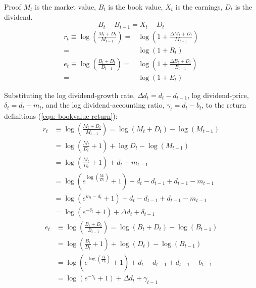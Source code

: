 \documentclass{beamer}
\begin{document}
\begin{frame}[allowframebreaks]{Proof}
		$ M_t $ is the market value, $B_t$ is the book value, $X_t$ is the earnings, $ D_{t} $ is the dividend.
		\begin{equation}
			B_{t}-B_{t-1}=X_{t}-D_{t}
		\end{equation}
	\begin{equation}\label{equ: bookvalue return}
		\begin{aligned}
			r_{t} \equiv \log \left(\frac{M_{t}+D_{t}}{M_{t-1}}\right)=&\log \left(1+\frac{\Delta M_{t}+D_{t}}{M_{t-1}}\right) \\
			=&\log \left(1+R_{t}\right) \\
			e_{t} \equiv \log \left(\frac{B_{t}+D_{t}}{B_{t-1}}\right)=&\log \left(1+\frac{\Delta B_{t}+D_{t}}{B_{t-1}}\right) \\
			=&\log \left(1+E_{t}\right)
		\end{aligned}
	\end{equation}

\pagebreak

Substituting the log dividend-growth rate, $\Delta d_{t}=d_{t}-d_{t-1}$, log dividend-price, $\delta_{t}=d_{t}-m_{t}$, and the log dividend-accounting ratio, $\gamma_{t}=d_{t}-b_{t}$, to the return definitions  (\ref{equ: bookvalue return}):
\begin{equation}\label{equ:log r}
	\begin{aligned}
	r_{t} &\equiv \log \left(\frac{M_{t}+D_{t}}{M_{t-1}}\right)=\log (M_{t}+D_{t}) - \log (M_{t-1})\\
	&= \log (\frac{M_t}{D_t} + 1 ) + \log D_t - \log (M_{t-1}) \\
	& = \log (\frac{M_t}{D_t} + 1 ) + d_t - m_{t-1}\\
	&= \log(e^{\log(\frac{M_t}{D_t})} + 1) + d_t - d_{t-1} + d_{t-1} - m_{t-1}\\
	&= \log(e^{m_t - d_t} + 1) + d_t - d_{t-1} + d_{t-1} - m_{t-1}\\
	&= \log(e^{-\delta_t} + 1) + \Delta d_t + \delta_{t-1}
	\end{aligned}
\end{equation}
\begin{equation}\label{equ:log e}
	\begin{aligned}
			e_{t} & \equiv \log \left(\frac{B_{t}+D_{t}}{B_{t-1}}\right)=\log \left(B_{t}+D_{t}\right)-\log \left(B_{t-1}\right) \\
			&=\log \left(\frac{B_{t}}{D_{t}}+1\right)+\log \left(D_{t}\right)-\log \left(B_{t-1}\right) \\
			&=\log \left(e^{\log \left(\frac{B_{t}}{D_{t}}\right)}+1\right)+d_{t}-d_{t-1}+d_{t-1}-b_{t-1} \\
			&=\log \left(e^{-\gamma_{t}}+1\right)+\Delta d_{t}+\gamma_{t-1}
	\end{aligned}
\end{equation}


\end{frame}
\end{document}
